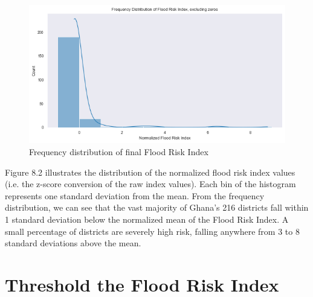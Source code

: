 \begin{figure}
  \begin{center}
    \includegraphics[scale=0.7]{images/02-graph.png}
  \end{center}
  \caption{Frequency distribution of final Flood Risk Index}
\end{figure}

Figure 8.2 illustrates the distribution of the normalized flood risk index values (i.e. the z-score conversion of the raw index values). Each bin of the histogram represents one standard deviation from the mean. From the frequency distribution, we can see that the vast majority of Ghana’s 216 districts fall within 1 standard deviation below the normalized mean of the Flood Risk Index. A small percentage of districts are severely high risk, falling anywhere from 3 to 8 standard deviations above the mean.

\section{Threshold the Flood Risk Index}

